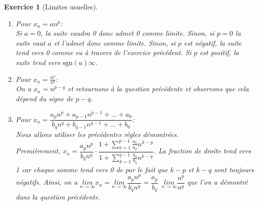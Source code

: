 \documentclass{article}
\theoremstyle{exercice}
\newtheorem{exercice}{Exercice}
\begin{document}
\begin{exercice}[Limites usuelles]
\begin{enumerate}
    Nous avons trouvé un rang à partir duquel la propriété est vraie. La suite tend bien vers 0.
    \item Pour $x_n=a n^p$:\\
    Si $a=0$, la suite vaudra 0 donc admet 0 comme limite. Sinon, si $p=0$ la suite vaut $a$ et l'admet donc comme limite. Sinon, si $p$ est négatif, la suite tend vers 0 comme vu à travers de l'exercice précédent. Si $p$ est positif, la suite tend vers $\text{sgn}(a) \infty$.
    \item Pour $x_n=\frac{n^p}{n^q}$:\\
    On a $x_n=n^{p-q}$ et retournons à la question précédente et observons que cela dépend du signe de $p-q$.
    \item Pour $x_n=\dfrac{a_pn^p+a_{p-1}n^{p-1}+...+a_0}{b_qn^q+b_{q-1}n^{q-1}+...+b_0}$:\\
    Nous allons utiliser les précédentes règles démontrées.\\ Premièrement, $x_n=\dfrac{a_pn^p}{b_qn^q}\cdot\dfrac{1+\sum_{k=1}^{p-1} \frac{a_k}{a_p}n^{k-p}}{1+\sum_{k=1}^{q-1} \frac{b_k}{b_q}n^{k-q}}$. La fraction de droite tend vers 1 car chaque somme tend vers 0 de par le fait que $k-p$ et $k-q$ sont toujours négatifs. Ainsi, on a $\underset{{n\to\infty}}{lim} x_n=\underset{{n\to\infty}}{lim} \dfrac{a_pn^p}{b_qn^q}=\dfrac{a_p}{b_q}~~\underset{{n\to\infty}}{lim} \dfrac{n^p}{n^q}$ que l'on a démontré dans la question précédente.  
\end{enumerate}


\end{exercice}
\end{document}
